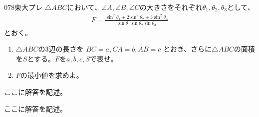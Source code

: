 \begin{prob}{078}{}{東大プレ}
 $\triangle{ABC}$において、$\angle{A}, \angle{B}, \angle{C}$の大きさをそれぞれ$\theta_1, \theta_2, \theta_3$として、
 \begin{align*}
  F=\frac{\sin^2\theta_1+2\sin^2\theta_2+3\sin^2\theta_3}{\sin\theta_1 \sin\theta_2 \sin\theta_3}
 \end{align*}
 とおく。
 \begin{enumerate}
  \item $\triangle{ABC}$の3辺の長さを $BC=a, CA=b, AB=c$ とおき、さらに$\triangle{ABC}$の面積を$S$とする。$F$を$a, b, c, S$で表せ。
  \item $F$の最小値を求めよ。
 \end{enumerate}
\end{prob}
ここに解答を記述。

ここに解答を記述。